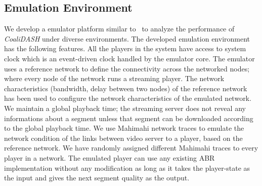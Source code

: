 \subsection{Emulation Environment}
\label{sec:simulatorprop}
We develop a emulator platform similar to~\cite{Pensieve} to analyze the performance of \textit{CoaliDASH} under diverse environments. The developed emulation environment has the following features. All the players in the system have access to system clock which is an event-driven clock handled by the emulator core. The emulator uses a reference network to define the connectivity across the networked nodes; where every node of the network runs a streaming player. The network characteristics (bandwidth, delay between two nodes) of the reference network has been used to configure the network characteristics of the emulated network. We maintain a global playback time; the streaming server does not reveal any informations about a segment unless that segment can be downloaded according to the global playback time. We use Mahimahi \cite{mahimahi} network traces to emulate the network condition of the links between video server to a player, based on the reference network. We have randomly assigned different Mahimahi traces to every player in a network. The emulated player can use any existing ABR implementation without any modification as long as it takes the player-state as the input and gives the next segment quality as the output. 

